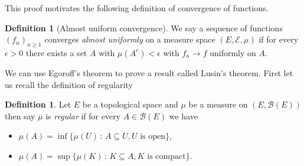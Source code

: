 \documentclass[11pt]{article}
\newtheorem{lem}[thm]{Lemma}
\theoremstyle{definition}
\newtheorem{dfn}[thm]{Definition}
\theoremstyle{remark}
\begin{document}
This proof motivates the following definition of convergence of functions.
\begin{dfn}[Almost uniform convergence]
We say a sequence of functions $(f_n)_{n \geq 1}$ converges \emph{almost uniformly} on a measure space $(E, \mathcal{E}, \mu)$ if for every $\epsilon >0$ there exists a set $A$ with $\mu(A^c)< \epsilon$ with $f_n \rightarrow f$ uniformly on $A$.
\end{dfn}

We can use Egoroff's theorem to prove a result called Lusin's theorem. First let us recall the definition of regularity
\begin{dfn}
Let $E$ be a topological space and $\mu$ be a measure on $(E, \mathcal{B}(E))$ then say $\mu$ is \emph{regular} if for every $A \in \mathcal{B}(E)$ we have
\begin{itemize}
\item $\mu(A) = \inf \{ \mu(U) \,:\, A \subseteq U, \mbox{$U$ is open}\}$,
\item $\mu(A) = \sup \{ \mu(K) \,:\, K \subseteq A, \mbox{$K$ is compact}\}$.
\end{itemize}
\end{dfn}
\end{document}
